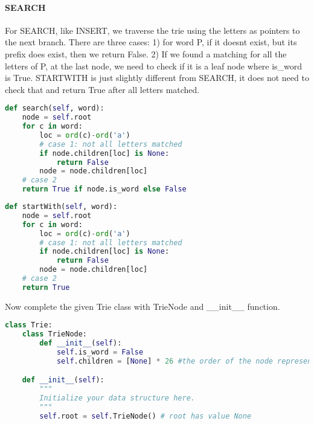 \documentclass[../main.tex]{subfiles}
\begin{document}
\begin{examples}
\paragraph{SEARCH} For SEARCH, like INSERT, we traverse the trie using the letters as pointers to the next branch. There are three cases: 1) for word P, if it doesnt exist, but its prefix does exist, then we return False. 2) If we found a matching for all the letters of P, at the last node, we need to check if it is a leaf node where is\_word is True.  STARTWITH is just slightly different from SEARCH, it does not need to check that and return True after all letters matched. 
\begin{lstlisting}[language=Python]
def search(self, word):
    node = self.root
    for c in word:
        loc = ord(c)-ord('a')
        # case 1: not all letters matched 
        if node.children[loc] is None: 
            return False          
        node = node.children[loc]
    # case 2
    return True if node.is_word else False
\end{lstlisting}
\begin{lstlisting}[language=Python]
def startWith(self, word):
    node = self.root
    for c in word:
        loc = ord(c)-ord('a')
        # case 1: not all letters matched 
        if node.children[loc] is None: 
            return False          
        node = node.children[loc]
    # case 2
    return True
\end{lstlisting}
Now complete the given Trie class with TrieNode and \_\_init\_\_ function.
\begin{lstlisting}[language=Python]
class Trie:
    class TrieNode:
        def __init__(self):
            self.is_word = False
            self.children = [None] * 26 #the order of the node represents a char

    def __init__(self):
        """
        Initialize your data structure here.
        """
        self.root = self.TrieNode() # root has value None       
\end{lstlisting}
\end{examples}
\end{document}
